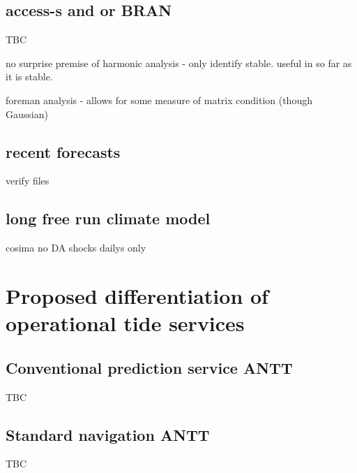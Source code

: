 \subsection{access-s and or BRAN}
TBC



no surprise
premise of harmonic analysis - only identify stable.
useful in so far as it is stable.

foreman analysis - allows for some measure of matrix condition (though Gaussian)


\subsection{ recent forecasts }
verify files


\subsection{ long free run climate model }
cosima
no DA shocks
dailys only


\section{Proposed differentiation of operational tide services}
\subsection{Conventional prediction service ANTT}

TBC

\subsection{Standard navigation ANTT}

TBC
